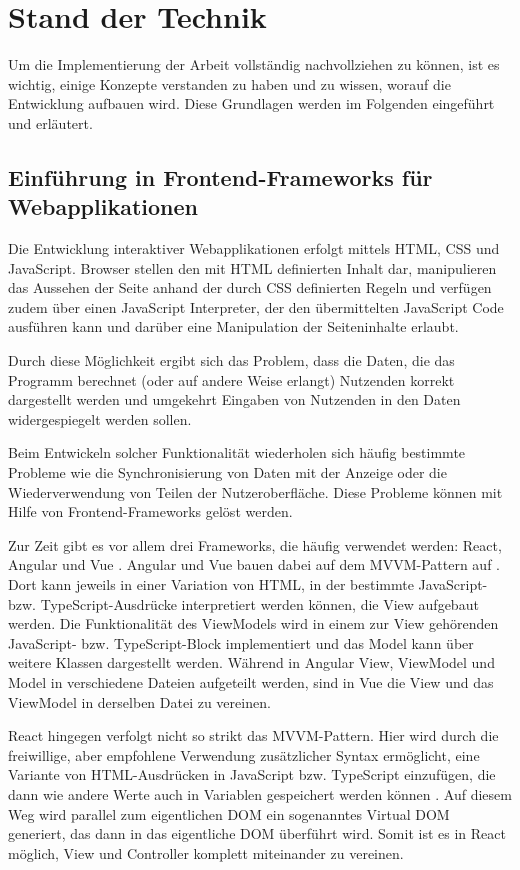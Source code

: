 \section{Stand der Technik}
Um die Implementierung der Arbeit vollständig nachvollziehen zu können, ist es wichtig, einige Konzepte verstanden zu haben und zu wissen, worauf die Entwicklung aufbauen wird. Diese Grundlagen werden im Folgenden eingeführt und erläutert.

\subsection{Einführung in Frontend-Frameworks für Webapplikationen}
Die Entwicklung interaktiver Webapplikationen erfolgt mittels HTML, CSS und JavaScript. Browser stellen den mit HTML definierten Inhalt dar, manipulieren das Aussehen der Seite anhand der durch CSS definierten Regeln und verfügen zudem über einen JavaScript Interpreter, der den übermittelten JavaScript Code ausführen kann und darüber eine Manipulation der Seiteninhalte erlaubt.

Durch diese Möglichkeit ergibt sich das Problem, dass die Daten, die das Programm berechnet (oder auf andere Weise erlangt) Nutzenden korrekt dargestellt werden und umgekehrt Eingaben von Nutzenden in den Daten widergespiegelt werden sollen.

Beim Entwickeln solcher Funktionalität wiederholen sich häufig bestimmte Probleme wie die Synchronisierung von Daten mit der Anzeige oder die Wiederverwendung von Teilen der Nutzeroberfläche. Diese Probleme können mit Hilfe von Frontend-Frameworks gelöst werden.

Zur Zeit gibt es vor allem drei Frameworks, die häufig verwendet werden: React, Angular und Vue \cite{stateofjs}. Angular und Vue bauen dabei auf dem \gls{MVVM}-Pattern auf \cite{angular_mvvm}. Dort kann jeweils in einer Variation von HTML, in der bestimmte JavaScript- bzw. TypeScript-Ausdrücke interpretiert werden können, die View aufgebaut werden. Die Funktionalität des ViewModels wird in einem zur View gehörenden JavaScript- bzw. TypeScript-Block implementiert und das Model kann über weitere Klassen dargestellt werden. Während in Angular View, ViewModel und Model in verschiedene Dateien aufgeteilt werden, sind in Vue die View und das ViewModel in derselben Datei zu vereinen.

React hingegen verfolgt nicht so strikt das \gls{MVVM}-Pattern. Hier wird durch die freiwillige, aber empfohlene Verwendung zusätzlicher Syntax ermöglicht, eine Variante von HTML-Ausdrücken in JavaScript bzw. TypeScript einzufügen, die dann wie andere Werte auch in Variablen gespeichert werden können \cite{react_jsx}. Auf diesem Weg wird parallel zum eigentlichen \gls{DOM} ein sogenanntes Virtual \gls{DOM} generiert, das dann in das eigentliche \gls{DOM} überführt wird. Somit ist es in React möglich, View und Controller komplett miteinander zu vereinen.

